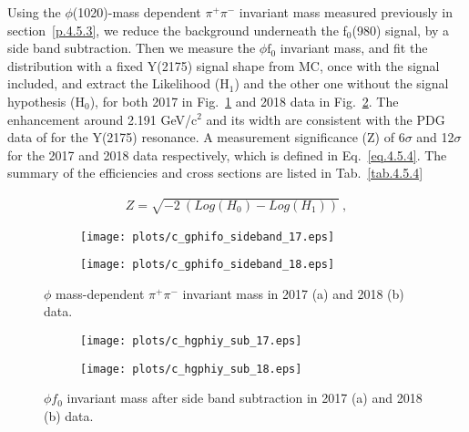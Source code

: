 Using the $\phi$(1020)-mass dependent $\pi^+ \pi^-$ invariant mass measured previously in section~\ref{p.4.5.3}, we reduce the background underneath the f$_0$(980) signal, by a side band subtraction. Then we measure the $\phi \mathrm{f}_0$ invariant mass, and fit the distribution with a fixed Y(2175) signal shape from MC, once with the signal included, and extract the Likelihood (H$_1$) and the other one without the signal hypothesis (H$_0$), for both 2017 in Fig.~\ref{fig.4.5.4.1.a} and 2018 data in Fig.~\ref{fig.4.5.4.1.b}. The enhancement around 2.191 GeV/c$^2$ and its width are consistent with the PDG data of for the Y(2175) resonance. A measurement significance (Z) of 6$\sigma$ and 12$\sigma$ for the 2017 and 2018 data respectively, which is defined in Eq.~\ref{eq.4.5.4}. The summary of the efficiencies and cross sections are listed in Tab.~\ref{tab.4.5.4}

\begin{equation}
    \label{eq.4.5.4}
    \begin{aligned}
        Z = \sqrt{-2 ~(Log(H_{0}) - Log(H_{1}))}~,
    \end{aligned}
\end{equation}

\begin{figure}[H]
    \centering
    \begin{subfigure}[b]{0.45\textwidth}
        \texttt{[image: plots/c\_gphifo\_sideband\_17.eps]}
        \caption{}
        \label{fig.4.5.4.1.a}
    \end{subfigure}
    \begin{subfigure}[b]{0.45\textwidth}
        \texttt{[image: plots/c\_gphifo\_sideband\_18.eps]}
        \caption{}
        \label{fig.4.5.4.1.b}
    \end{subfigure}
    \caption{$\phi$ mass-dependent $\pi^+ \pi^-$ invariant mass in 2017 (a) and 2018 (b) data.}
    \label{fig.4.5.4.1}
\end{figure}

\begin{figure}[H]
    \centering
    \begin{subfigure}[b]{0.45\textwidth}
        \texttt{[image: plots/c\_hgphiy\_sub\_17.eps]}
        \caption{}
        \label{fig.4.5.4.2.a}
    \end{subfigure}
    \begin{subfigure}[b]{0.45\textwidth}
        \texttt{[image: plots/c\_hgphiy\_sub\_18.eps]}
        \caption{}
        \label{fig.4.5.4.2.b}
    \end{subfigure}
    \caption{$\phi f_0$ invariant mass after side band subtraction in 2017 (a) and 2018 (b) data.}
    \label{fig:4.5.4.2}
\end{figure}


